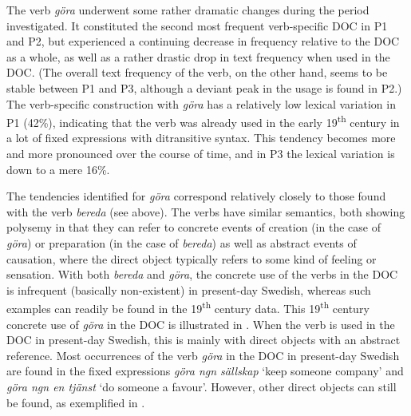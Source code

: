 \documentclass[output=paper]{langscibook}
\begin{document}
\label{sec:valdeson:5.3.1.2}



The verb \textit{göra} underwent some rather dramatic changes during the period investigated. It constituted the second most frequent verb-specific DOC in P1 and P2, but experienced a continuing decrease in frequency relative to the DOC as a whole, as well as a rather drastic drop in text frequency when used in the DOC. (The overall text frequency of the verb, on the other hand, seems to be stable between P1 and P3, although a deviant peak in the usage is found in P2.) The verb-specific construction with \textit{göra} has a relatively low lexical variation in P1 (42\%), indicating that the verb was already used in the early 19\textsuperscript{th} century in a lot of fixed expressions with ditransitive syntax. This tendency becomes more and more pronounced over the course of time, and in P3 the lexical variation is down to a mere 16\%.


\begin{table}
\caption{Frequency measures of the verb-specific DOC with \textit{göra} ‘make, do’\label{tab:valdeson:9}}
\end{table}

The tendencies identified for \textit{göra} correspond relatively closely to those found with the verb \textit{bereda} (see above). The verbs have similar semantics, both showing polysemy in that they can refer to concrete events of creation (in the case of \textit{göra}) or preparation (in the case of \textit{bereda}) as well as abstract events of causation, where the direct object typically refers to some kind of feeling or sensation. With both \textit{bereda} and \textit{göra}, the concrete use of the verbs in the DOC is infrequent (basically non-existent) in present-day Swedish, whereas such examples can readily be found in the 19\textsuperscript{th} century data. This 19\textsuperscript{th} century concrete use of \textit{göra} in the DOC is illustrated in . When the verb is used in the DOC in present-day Swedish, this is mainly with direct objects with an abstract reference. Most occurrences of the verb \textit{göra} in the DOC in present-day Swedish are found in the fixed expressions \textit{göra ngn sällskap} ‘keep someone company’ and \textit{göra ngn en tjänst} ‘do someone a favour’. However, other direct objects can still be found, as exemplified in .
\end{document}

